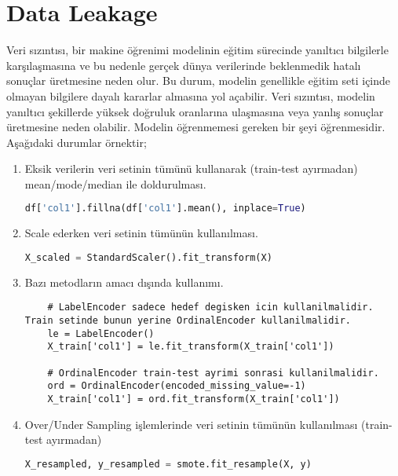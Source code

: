 \section{Data Leakage}
Veri sızıntısı, bir makine öğrenimi modelinin eğitim sürecinde yanıltıcı bilgilerle karşılaşmasına ve bu nedenle gerçek dünya verilerinde beklenmedik hatalı sonuçlar üretmesine neden olur. Bu durum, modelin genellikle eğitim seti içinde olmayan bilgilere dayalı kararlar almasına yol açabilir. Veri sızıntısı, modelin yanıltıcı şekillerde yüksek doğruluk oranlarına ulaşmasına veya yanlış sonuçlar üretmesine neden olabilir. Modelin öğrenmemesi gereken bir şeyi öğrenmesidir. Aşağıdaki durumlar örnektir;

\begin{enumerate}
    \item Eksik verilerin veri setinin tümünü kullanarak (train-test ayırmadan) mean/mode/median ile doldurulması.
    \begin{lstlisting}[language=Python]
    df['col1'].fillna(df['col1'].mean(), inplace=True)
    \end{lstlisting}
    \item Scale ederken veri setinin tümünün kullanılması.
    \begin{lstlisting}[language=Python]
    X_scaled = StandardScaler().fit_transform(X)
    \end{lstlisting}
    \item Bazı metodların amacı dışında kullanımı.
    \begin{lstlisting}
    # LabelEncoder sadece hedef degisken icin kullanilmalidir. Train setinde bunun yerine OrdinalEncoder kullanilmalidir.
    le = LabelEncoder()
    X_train['col1'] = le.fit_transform(X_train['col1'])

    # OrdinalEncoder train-test ayrimi sonrasi kullanilmalidir.
    ord = OrdinalEncoder(encoded_missing_value=-1)
    X_train['col1'] = ord.fit_transform(X_train['col1'])
    \end{lstlisting}
    \item Over/Under Sampling işlemlerinde veri setinin tümünün kullanılması (train-test ayırmadan)
    \begin{lstlisting}[language=Python]
    X_resampled, y_resampled = smote.fit_resample(X, y)
    \end{lstlisting}
\end{enumerate}

\newpage
